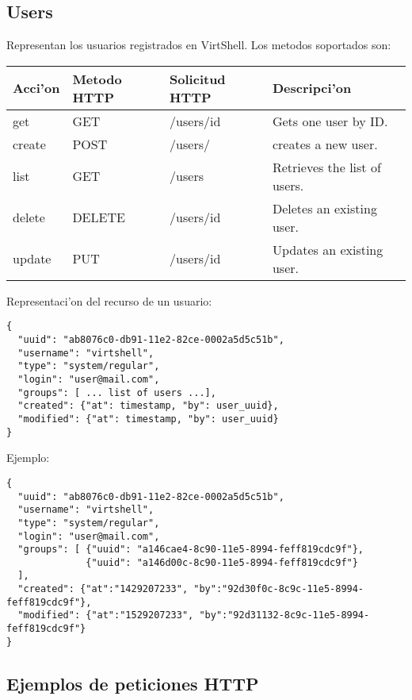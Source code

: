 \subsection{Users}
Representan los usuarios registrados en VirtShell. Los metodos soportados son:

\begin{center}
 \begin{tabular}{| l | l | l | l |}
 \hline
  \rowcolor{blueapi}
  \textbf{Acci'on} & \textbf{Metodo HTTP} & \textbf{Solicitud HTTP} & \textbf{Descripci'on} \\ [0.5ex] 
  \hline\hline
  get & GET & /users/id & Gets one user by ID. \\
  \hline
  create & POST & /users/ & creates a new user. \\
  \hline
  list & GET & /users & Retrieves the list of users. \\  
  \hline
  delete & DELETE & /users/id & Deletes an existing user. \\
  \hline  
  update & PUT & /users/id & Updates an existing user. \\ [1ex]  
  \hline
\end{tabular}
\end{center}

\vspace{1cm}
Representaci'on del recurso de un usuario:
\vspace{1cm}

\begin{lstlisting}[style=json]
{
  "uuid": "ab8076c0-db91-11e2-82ce-0002a5d5c51b",
  "username": "virtshell",
  "type": "system/regular",
  "login": "user@mail.com",
  "groups": [ ... list of users ...],
  "created": {"at": timestamp, "by": user_uuid},
  "modified": {"at": timestamp, "by": user_uuid}
}
\end{lstlisting}

Ejemplo:

\medskip
\begin{lstlisting}[style=json]
{
  "uuid": "ab8076c0-db91-11e2-82ce-0002a5d5c51b",
  "username": "virtshell",
  "type": "system/regular",
  "login": "user@mail.com",
  "groups": [ {"uuid": "a146cae4-8c90-11e5-8994-feff819cdc9f"},
              {"uuid": "a146d00c-8c90-11e5-8994-feff819cdc9f"}
  ],
  "created": {"at":"1429207233", "by":"92d30f0c-8c9c-11e5-8994-feff819cdc9f"},
  "modified": {"at":"1529207233", "by":"92d31132-8c9c-11e5-8994-feff819cdc9f"}
}
\end{lstlisting}

\subsection{Ejemplos de peticiones HTTP}

